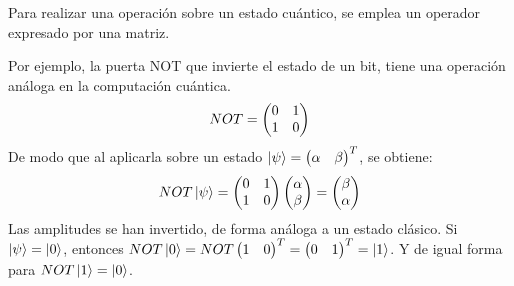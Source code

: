 Para realizar una operación sobre un estado cuántico, se emplea un operador 
expresado por una matriz.

Por ejemplo, la puerta NOT que invierte el estado de un bit, tiene una operación 
análoga en la computación cuántica.
%
$$ NOT = \begin{pmatrix} 0 & 1 \\ 1 & 0 \end{pmatrix} $$
%
De modo que al aplicarla sobre un estado $\ket{\psi} = \begin{pmatrix} \alpha & \beta \end{pmatrix}^T$, 
se obtiene:
%
$$ NOT \ket{\psi} = \begin{pmatrix} 0 & 1 \\ 1 & 0 \end{pmatrix} \begin{pmatrix} \alpha \\ \beta \end{pmatrix} = \begin{pmatrix} \beta \\ 
\alpha \end{pmatrix} $$
%
Las amplitudes se han invertido, de forma análoga a un estado clásico. Si 
$\ket{\psi} = \ket{0}$, entonces $NOT\ket{0} = NOT \begin{pmatrix} 1 & 0 \end{pmatrix}^T = \begin{pmatrix} 0 & 
1 \end{pmatrix}^T = \ket{1}$. Y de igual forma para $NOT \ket{1} = \ket{0}$.

\newpage


